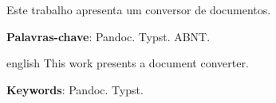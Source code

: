 \documentclass[12pt,a4paper,oneside,english,brazil]{abntex2}
\begin{document}
\imprimircapa
\imprimirfolhaderosto
\begin{resumo}
Este trabalho apresenta um conversor de documentos.

\textbf{Palavras-chave}: Pandoc. Typst. ABNT.
\end{resumo}
\begin{resumo}[Abstract]
\begin{otherlanguage*}{english}
This work presents a document converter.

\vspace{\onelineskip}
\noindent
\textbf{Keywords}: Pandoc. Typst.
\end{otherlanguage*}
\end{resumo}
\tableofcontents*
\textual



\end{document}

